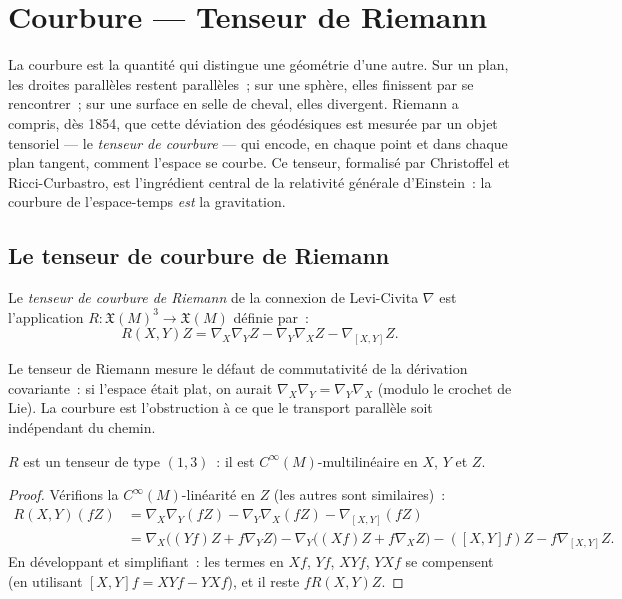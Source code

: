 \chapter{Courbure --- Tenseur de Riemann}
\label{ch:courbure}

La courbure est la quantit\'e qui distingue une g\'eom\'etrie d'une autre. Sur un plan, les droites parall\`eles restent parall\`eles~; sur une sph\`ere, elles finissent par se rencontrer~; sur une surface en selle de cheval, elles divergent. Riemann a compris, d\`es 1854, que cette d\'eviation des g\'eod\'esiques est mesur\'ee par un objet tensoriel --- le \emph{tenseur de courbure} --- qui encode, en chaque point et dans chaque plan tangent, comment l'espace se courbe. Ce tenseur, formalis\'e par Christoffel et Ricci-Curbastro, est l'ingr\'edient central de la relativit\'e g\'en\'erale d'Einstein~: la courbure de l'espace-temps \emph{est} la gravitation.

\section{Le tenseur de courbure de Riemann}

\begin{definition}
Le \emph{tenseur de courbure de Riemann} de la connexion de Levi-Civita $\nabla$
est l'application $R : \mathfrak{X}(M)^3 \to \mathfrak{X}(M)$ d\'efinie par~:
\[
    R(X,Y)Z = \nabla_X \nabla_Y Z - \nabla_Y \nabla_X Z - \nabla_{[X,Y]} Z.
\]
\end{definition}

\begin{intuition}[title=\textbf{La courbure mesure la non-commutativit\'e}]
Le tenseur de Riemann mesure le d\'efaut de commutativit\'e de la d\'erivation
covariante~: si l'espace \'etait plat, on aurait $\nabla_X \nabla_Y = \nabla_Y \nabla_X$
(modulo le crochet de Lie). La courbure est l'obstruction \`a ce que le transport
parall\`ele soit ind\'ependant du chemin.
\end{intuition}

\begin{proposition}
$R$ est un tenseur de type $(1,3)$~: il est $C^\infty(M)$-multilin\'eaire en $X$,
$Y$ et $Z$.
\end{proposition}

\begin{proof}
V\'erifions la $C^\infty(M)$-lin\'earit\'e en $Z$ (les autres sont similaires)~:
\begin{align*}
    R(X,Y)(fZ) &= \nabla_X\nabla_Y(fZ) - \nabla_Y\nabla_X(fZ) - \nabla_{[X,Y]}(fZ) \\
    &= \nabla_X\big((Yf)Z + f\nabla_Y Z\big) - \nabla_Y\big((Xf)Z + f\nabla_X Z\big)
    - ([X,Y]f)Z - f\nabla_{[X,Y]}Z.
\end{align*}
En d\'eveloppant et simplifiant~: les termes en $Xf$, $Yf$, $XYf$, $YXf$ se
compensent (en utilisant $[X,Y]f = XYf - YXf$), et il reste $fR(X,Y)Z$.
\end{proof}

